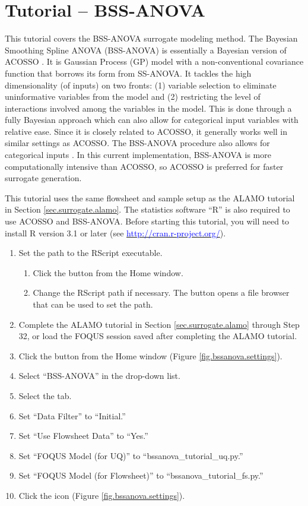 \section{Tutorial -- BSS-ANOVA}
\label{(sec.surrogate.bssanova)}

This tutorial covers the BSS-ANOVA surrogate modeling method.  The Bayesian
Smoothing Spline ANOVA (BSS-ANOVA) is essentially a Bayesian version of
ACOSSO \citep{Reich_2009}.  It is Gaussian Process (GP) model with a
non-conventional covariance function that borrows its form from SS-ANOVA.
It tackles the high dimensionality (of inputs) on two fronts: (1) variable
selection to eliminate uninformative variables from the model and (2)
restricting the level of interactions involved among the variables in the
model. This is done through a fully Bayesian approach which can also allow
for categorical input variables with relative ease. Since it is closely
related to ACOSSO, it generally works well in similar settings as
ACOSSO. The BSS-ANOVA procedure also allows for categorical inputs
\citep{Storlie_2013}. In this current implementation, BSS-ANOVA is more
computationally intensive than ACOSSO, so ACOSSO is preferred for faster
surrogate generation. 

This tutorial uses the same flowsheet and sample setup as the ALAMO
tutorial in Section \ref{sec.surrogate.alamo}. The statistics software
``R'' is also required to use ACOSSO and BSS-ANOVA. Before starting this
tutorial, you will need to install R version 3.1 or later (see \href{https://cran.r-project.org/}{\textcolor{blue}{http://cran.r-project.org/}}).

\begin{enumerate}
	\item{Set the path to the RScript executable.}
		\begin{enumerate}
			\item Click the  button from the Home window.
			\item Change the RScript path if necessary.  The  button opens a file browser that can be used to set the path.
		\end{enumerate}
	\item Complete the ALAMO tutorial in Section \ref{sec.surrogate.alamo} through Step 32, or load the FOQUS session saved after completing the ALAMO tutorial.
	\item Click the  button from the Home window (Figure \ref{fig.bssanova.settings}).
	\item Select ``BSS-ANOVA'' in the  drop-down list.
	\item Select the  tab.
	\item Set ``Data Filter'' to ``Initial.''
	\item Set ``Use Flowsheet Data'' to ``Yes.''
	\item Set ``FOQUS Model (for UQ)'' to ``bssanova\_tutorial\_uq.py.''
	\item Set ``FOQUS Model (for Flowsheet)'' to ``bssanova\_tutorial\_fs.py.''
	\item Click the  icon (Figure \ref{fig.bssanova.settings}).
\end{enumerate}

